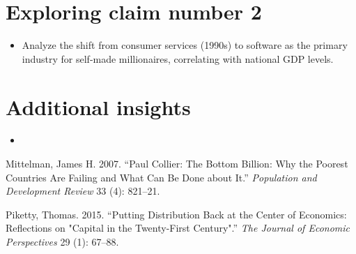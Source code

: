 \documentclass[preprint]{elsarticle}
\numberwithin{equation}{section}
\numberwithin{figure}{section}
\numberwithin{table}{section}
\def\tightlist{} %
\newlength{\cslhangindent}
\newenvironment{CSLReferences}[2] %
{\begin{list}{}{%
	\setlength{\itemindent}{0pt}
	\setlength{\leftmargin}{0pt}
	\setlength{\parsep}{0pt}
	\ifodd #1
	\setlength{\leftmargin}{\cslhangindent}
	\setlength{\itemindent}{-1\cslhangindent}
	\fi
	\setlength{\itemsep}{#2\baselineskip}}}
{\end{list}}
\begin{document}
\section{Exploring claim number 2}\label{exploring-claim-number-2}

\begin{itemize}
\tightlist
\item
  Analyze the shift from consumer services (1990s) to software as the
  primary industry for self-made millionaires, correlating with national
  GDP levels.
\end{itemize}

\section{Additional insights}\label{additional-insights}

\begin{itemize}
\tightlist
\item
\end{itemize}

\label{refs}
\begin{CSLReferences}{1}{0}
Mittelman, James H. 2007. {``Paul Collier: The Bottom Billion: Why the
Poorest Countries Are Failing and What Can Be Done about It.''}
\emph{Population and Development Review} 33 (4): 821--21.

Piketty, Thomas. 2015. {``Putting Distribution Back at the Center of
Economics: Reflections on "Capital in the Twenty-First Century".''}
\emph{The Journal of Economic Perspectives} 29 (1): 67--88.

\end{CSLReferences}


\end{document}
